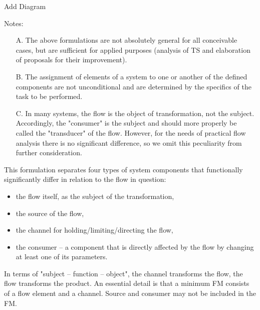 \documentclass[a4paper,11pt]{article}
\begin{document}
\begin{center}
  Add Diagram
\end{center}

Notes:
\begin{itemize}
\item[A.] The above formulations are not absolutely general for all
  conceivable cases, but are sufficient for applied purposes (analysis of TS
  and elaboration of proposals for their improvement).
\item[B.] The assignment of elements of a system to one or another of the
  defined components are not unconditional and are determined by the specifics
  of the task to be performed.
\item[C.] In many systems, the flow is the object of transformation, not the
  subject.  Accordingly, the "consumer" is the subject and should more
  properly be called the "transducer" of the flow. However, for the needs of
  practical flow analysis there is no significant difference, so we omit this
  peculiarity from further consideration.
\end{itemize}
This formulation separates four types of system components that functionally
significantly differ in relation to the flow in question:
\begin{itemize}
\item the flow itself, as the subject of the transformation,
\item the source of the flow,
\item the channel for holding/limiting/directing the flow,
\item the consumer -- a component that is directly affected by the flow by
  changing at least one of its parameters.
\end{itemize}
In terms of "subject -- function -- object", the channel transforms the flow,
the flow transforms the product. An essential detail is that a minimum FM
consists of a flow element and a channel. Source and consumer may not be
included in the FM.
\end{document}
